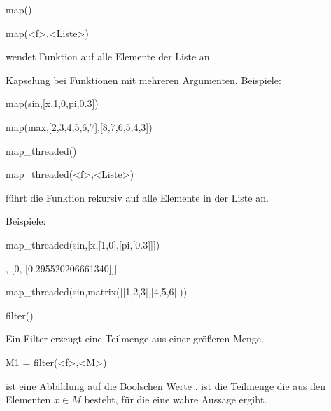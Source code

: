 \documentclass[fontsize=12pt,paper=a4,twoside,bibtotoc,idxtotoc,
liststotoc,pagesize,BCOR1.2cm,DIV15,chapterprefix,pagesize=pdftex]{scrbook}
\theoremstyle{plain}
\theoremstyle{definition}
\theoremstyle{remark}
\begin{document}
map()

\begin{sagein}
 map(<f>,<Liste>)
\end{sagein}
wendet Funktion  auf alle Elemente der Liste  an.

  Kapselung bei Funktionen mit mehreren Argumenten.
 Beispiele:
\begin{sagein}
map(sin,[x,1,0,pi,0.3])
\end{sagein}
\begin{sage}
\end{sage}
\begin{sagein}
map(max,[2,3,4,5,6,7],[8,7,6,5,4,3])
\end{sagein}
\begin{sage}
[8, 7, 6, 5, 6, 7]
\end{sage}



map\_threaded()

\begin{sagein}
map_threaded(<f>,<Liste>)
\end{sagein}
führt die Funktion  rekursiv auf alle Elemente in der Liste  an.

  Beispiele:
\begin{sagein}
map_threaded(sin,[x,[1,0],[pi,[0.3]]])
\end{sagein}
\begin{sage}
[sin(x), [sin(1), 0], [0, [0.295520206661340]]]
\end{sage}
\begin{sagein}
map_threaded(sin,matrix([[1,2,3],[4,5,6]]))
\end{sagein}
\begin{sage}
\end{sage}


filter()

Ein Filter erzeugt eine Teilmenge aus einer größeren Menge.
\begin{sagein}
M1 = filter(<f>,<M>)
\end{sagein}

  ist eine Abbildung auf die Boolschen Werte . 
  ist die Teilmenge  die aus den Elementen $x\in M$ besteht, für die  eine wahre Aussage
ergibt. 
\end{document}
